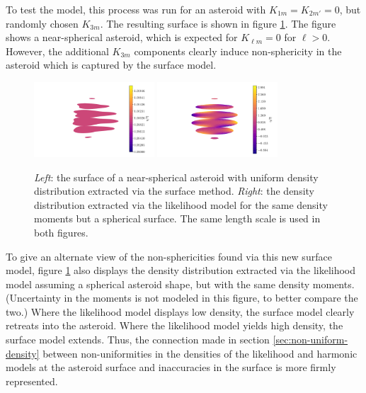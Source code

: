 \documentclass[fleqn,usenatbib]{mnras}
\begin{document}
To test the model, this process was run for an asteroid with $K_{1m}=K_{2m'}=0$, but randomly chosen $K_{3m}$. The resulting surface is shown in figure \ref{fig:surface-density}. The figure shows a near-spherical asteroid, which is expected for $K_{\ell m} = 0$ for $\ell > 0$. However, the additional $K_{3m}$ components clearly induce non-sphericity in the asteroid which is captured by the surface model.

\begin{figure}
  \centering
  \hfill
  \includegraphics[width=0.4\textwidth]{figs/high-surface.pdf}\hfill
  \includegraphics[width=0.4\textwidth]{figs/high-likelihood.pdf}\hfill
  \caption{\textit{Left}: the surface of a near-spherical asteroid with uniform density distribution extracted via the surface method. \textit{Right}: the density distribution extracted via the likelihood model for the same density moments but a spherical surface. The same length scale is used in both figures.}
  \label{fig:surface-density}
\end{figure}

To give an alternate view of the non-sphericities found via this new surface model, figure \ref{fig:surface-density} also displays the density distribution extracted via the likelihood model assuming a spherical asteroid shape, but with the same density moments. (Uncertainty in the moments is not modeled in this figure, to better compare the two.) Where the likelihood model displays low density, the surface model clearly retreats into the asteroid. Where the likelihood model yields high density, the surface model extends. Thus, the connection made in section \ref{sec:non-uniform-density} between non-uniformities in the densities of the likelihood and harmonic models at the asteroid surface and inaccuracies in the surface is more firmly represented.
\end{document}
